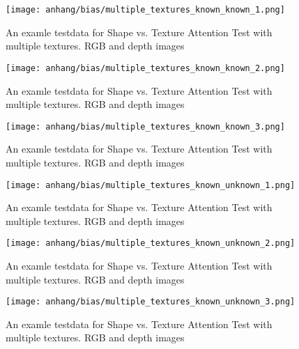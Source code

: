 	\iffalse
	\begin{figure}[H]
		\centering
		\texttt{[image: anhang/bias/multiple\_textures\_known\_known\_1.png]}
		\caption[An examle testdata for Shape vs. Texture Attention Test with multiple textures. RGB and depth images]{An examle testdata for Shape vs. Texture Attention Test with multiple textures. RGB and depth images}
	\end{figure}
	\begin{figure}[H]
		\centering
		\texttt{[image: anhang/bias/multiple\_textures\_known\_known\_2.png]}
		\caption[An examle testdata for Shape vs. Texture Attention Test with multiple textures. RGB and depth images]{An examle testdata for Shape vs. Texture Attention Test with multiple textures. RGB and depth images}
	\end{figure}
	\begin{figure}[H]
		\centering
		\texttt{[image: anhang/bias/multiple\_textures\_known\_known\_3.png]}
		\caption[An examle testdata for Shape vs. Texture Attention Test with multiple textures. RGB and depth images]{An examle testdata for Shape vs. Texture Attention Test with multiple textures. RGB and depth images}
	\end{figure}
	
	\begin{figure}[H]
		\centering
		\texttt{[image: anhang/bias/multiple\_textures\_known\_unknown\_1.png]}
		\caption[An examle testdata for Shape vs. Texture Attention Test with multiple textures. RGB and depth images]{An examle testdata for Shape vs. Texture Attention Test with multiple textures. RGB and depth images}
	\end{figure}
	\begin{figure}[H]
		\centering
		\texttt{[image: anhang/bias/multiple\_textures\_known\_unknown\_2.png]}
		\caption[An examle testdata for Shape vs. Texture Attention Test with multiple textures. RGB and depth images]{An examle testdata for Shape vs. Texture Attention Test with multiple textures. RGB and depth images}
	\end{figure}
	\begin{figure}[H]
		\centering
		\texttt{[image: anhang/bias/multiple\_textures\_known\_unknown\_3.png]}
		\caption[An examle testdata for Shape vs. Texture Attention Test with multiple textures. RGB and depth images]{An examle testdata for Shape vs. Texture Attention Test with multiple textures. RGB and depth images}
	\end{figure}
	
